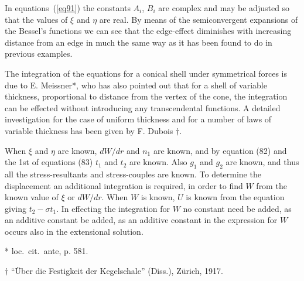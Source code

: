 In equations~(\ref{eq91}) the constants \(A_i\), \(B_i\) are complex and may be
adjusted so that the values of
\(\xi \) and \(\eta \) are
real. By means of the semiconvergent expansions of the Bessel's functions we
can see that the edge-effect diminishes with increasing distance from an edge
in much the same way as it has been found to do in previous examples.


The integration of the equations for a conical shell under symmetrical forces is due to E. Meissner*,
who has also pointed out that for a shell of variable thickness, proportional
to distance from the vertex of the cone, the integration can be effected
without introducing any transcendental functions. A detailed investigation for
the case of uniform thickness and for a number of laws of variable thickness
has been given by F. Dubois \(\dagger \).

When
\(\xi \) and \(\eta \) are known,
\(d W/dr\) and \(n_1\) are known, and by equation (82) and the 1st of equations (83)
\(t_1\) and \(t_2\) are known.  Also
\(g_1\) and \(g_2\) are known, and thus all the stress-resultants and
stress-couples are known.  To determine the displacement an additional
integration is required, in order to find
\(W\) from the known value of
\(\xi \) or \(d W/dr\).  When
\(W\) is known,
\(U\) is known from the equation giving
\(t_2 - \sigma t_1\).  In effecting the integration for
\(W\) no constant need be added, as an additive constant
be added, as an additive constant in the expression for
\(W\) occurs also in the extensional solution.

* loc.\ cit.\ ante, p. 581.

\(\dagger \) ``Über die Festigkeit der Kegelschale'' (Diss.), Zürich, 1917.
